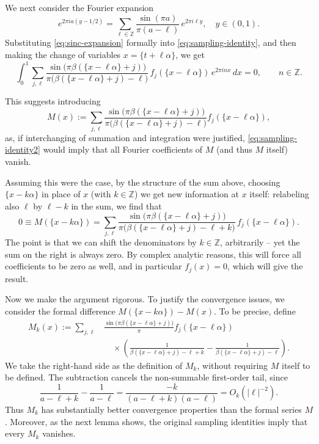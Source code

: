\documentclass[reqno,a4paper,12pt]{amsart}
\numberwithin{equation}{section}
\def\Z{{\mathbb Z}}
\newcommand\1{\mathds{1}}
\begin{document}
We next consider the Fourier expansion
\begin{equation}\label{eq:sinc-expansion}
 e^{2\pi ia(y-1/2)}
 =\sum_{\ell\in\Z}\frac{\sin(\pi a)}{\pi(a-\ell)}\,
 e^{2\pi i\ell y},\quad y\in(0,1).
\end{equation}
Substituting \eqref{eq:sinc-expansion} formally into
\eqref{eq:sampling-identity}, and then making the change of variables
$x=\{t+\ell\alpha\}$, we get
\begin{equation}\label{eq:sampling-identity2}
  \int_0^1\sum_{j,\ell}
 \frac{\sin\!\bigl(\pi\beta(\{x-\ell\alpha\}+j)\bigr)}
      {\pi\bigl(\beta(\{x-\ell\alpha\}+j)-\ell\bigr)}\,
 f_j(\{x-\ell\alpha\})\,
 e^{2\pi inx}\,dx=0,
 \qquad n\in\Z.  
\end{equation}

This suggests introducing
\[
 M(x):=\sum_{j,\ell}
 \frac{\sin\!\bigl(\pi\beta(\{x-\ell\alpha\}+j)\bigr)}
      {\pi\bigl(\beta(\{x-\ell\alpha\}+j)-\ell\bigr)}
 f_j(\{x-\ell\alpha\}),
\]
as, if interchanging of summation and integration were
justified, \eqref{eq:sampling-identity2} would imply that all Fourier
coefficients of \(M\) (and thus $M$ itself) vanish.

Assuming this were the case, by the structure of the sum above, choosing $\{x-k\alpha\}$ in place of $x$ (with $k\in\Z$) we get new
information at $x$ itself: relabeling also $\ell$ by
$\ell-k$ in the sum, we find that
\[
 0\equiv M(\{x-k\alpha\})=\sum_{j,\ell}
 \frac{\sin\!\bigl(\pi\beta(\{x-\ell\alpha\}+j)\bigr)}
      {\pi\bigl(\beta(\{x-\ell\alpha\}+j)-\ell+k\bigr)}\,
 f_j(\{x-\ell\alpha\}).
\]
The point is that we can shift the denominators by $k\in\Z$, arbitrarily -- yet the sum on the right is always zero. By complex analytic reasons, this will force all coefficients to be zero as well, and in particular $f_j(x)=0$, which will give the result.

Now we make the argument rigorous. To justify the convergence issues, we consider the formal difference
\(M(\{x-k\alpha\})-M(x)\). To be precise, define
\begin{equation}\label{eq:Mk-definition}
\begin{aligned}
 M_k(x):=\sum_{j,\ell}
 &\frac{\sin\!\bigl(\pi\beta(\{x-\ell\alpha\}+j)\bigr)}{\pi}
 f_j(\{x-\ell\alpha\})\\[-1mm]
 &\quad\times\left(
 \frac1{\beta(\{x-\ell\alpha\}+j)-\ell+k}
 -\frac1{\beta(\{x-\ell\alpha\}+j)-\ell}
 \right).
\end{aligned}
\end{equation}
We take the right-hand side as the definition of \(M_k\), without
requiring \(M\) itself to be defined. The subtraction cancels the
non-summable first-order tail, since
\[
 \frac1{a-\ell+k}-\frac1{a-\ell}
 =\frac{-k}{(a-\ell+k)(a-\ell)}
 =O_k(|\ell|^{-2}).
\]
Thus \(M_k\) has substantially better convergence properties than the
formal series \(M\). Moreover, as the next lemma shows, the original
sampling identities imply that every \(M_k\) vanishes.  
\end{document}
